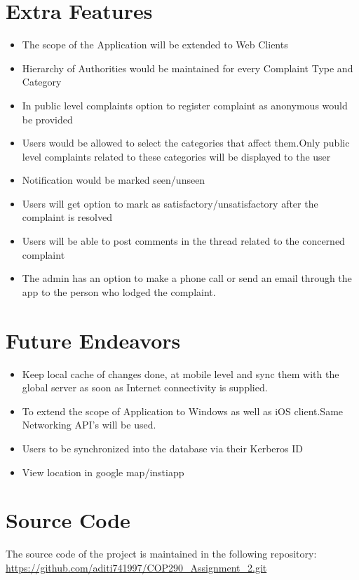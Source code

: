 \documentclass{article}
\begin{document}
	\section{Extra Features}
	\begin{itemize}
	\item The scope of the Application will be extended to Web Clients
	\item Hierarchy of Authorities would be maintained for every Complaint Type and Category
	\item In public level complaints option to register complaint as anonymous would be provided
	\item Users would be allowed to select the categories that affect them.Only public level complaints related to these categories will be displayed to the user
	\item Notification would be marked seen/unseen
	\item Users will get option to mark as satisfactory/unsatisfactory after the complaint is resolved
	\item Users will be able to post comments in the thread related to the concerned complaint
	\item The admin has an option to make a phone call or send an email through the app to the person who lodged the complaint.
	\end{itemize}

	\section{Future Endeavors} 
		\begin{itemize} 
			\item Keep local cache of changes done, at mobile level and sync them with the global server as soon as Internet connectivity is supplied.
			\item To extend the scope of Application to Windows as well as iOS client.Same Networking API's will be used.
			\item Users to be synchronized into the database via their Kerberos ID
			\item View location in google map/instiapp
		\end{itemize}   
	\section{Source Code}
	The source code of the project is maintained in the following repository: \\
	\url{https://github.com/aditi741997/COP290_Assignment_2.git}
	
	\medskip
	
\end{document}
